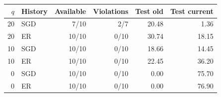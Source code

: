 \begin{tabular}{rlrrrr}
\toprule
$q$ & History & Available & Violations & Test old & Test current \\
\midrule
20 & SGD & 7/10 & 2/7 & 20.48 & 1.36 \\
20 & ER & 10/10 & 0/10 & 30.74 & 18.15 \\
10 & SGD & 10/10 & 0/10 & 18.66 & 14.45 \\
10 & ER & 10/10 & 0/10 & 22.45 & 36.20 \\
0 & SGD & 10/10 & 0/10 & 0.00 & 75.70 \\
0 & ER & 10/10 & 0/10 & 0.00 & 76.90 \\
\bottomrule
\end{tabular}
